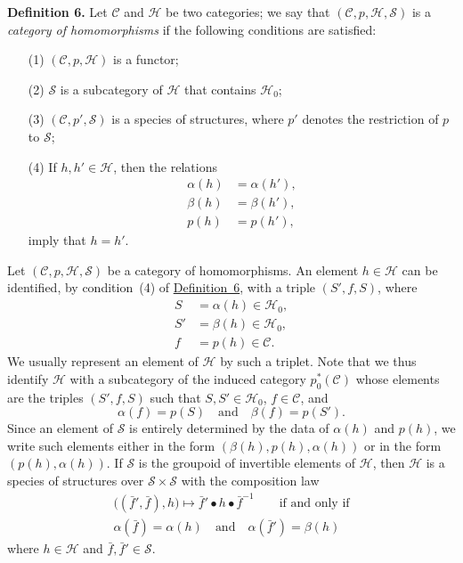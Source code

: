 \documentclass[a4paper,oneside,nobib,nofonts,notitlepage,notoc,nols,fleqn,justified]{tufte-book}
\newenvironment{rmenv}[1]
  {\phantomsection\par\medskip\noindent\textbf{#1.}\rmfamily}
  {\par\medskip}
\newcommand{\oldpage}[1]{{\reversemarginpar\marginnote{\raggedleft\footnotesize\textit{p.~#1}}}}
\newcommand{\CC}{\mathcal{C}}
\newcommand{\HH}{\mathcal{H}}
\renewcommand{\SS}{\mathcal{S}}
\begin{document}
\begin{rmenv}{Definition 6}
\label{definition:i-6}
  Let $\CC$ and $\HH$ be two categories;
  we say \cite{3a} that $(\CC,p,\HH,\SS)$ is a \emph{category of homomorphisms} if the following conditions are satisfied:
  \begin{enumerate}
    \item[\normalfont(1)]
      $(\CC,p,\HH)$ is a functor;
    \item[\normalfont(2)]
      \oldpage{357}
      $\SS$ is a subcategory of $\HH$ that contains $\HH_0$;
    \item[\normalfont(3)]
      $(\CC,p',\SS)$ is a species of structures, where $p'$ denotes the restriction of $p$ to $\SS$;
    \item[\normalfont(4)]
      If $h,h'\in\HH$, then the relations
      \[
        \begin{aligned}
          \alpha(h)
          &= \alpha(h'),
        \\\beta(h)
          &= \beta(h'),
        \\p(h)
          &= p(h'),
        \end{aligned}
      \]
      imply that $h=h'$.
  \end{enumerate}
\end{rmenv}

Let $(\CC,p,\HH,\SS)$ be a category of homomorphisms.
An element $h\in\HH$ can be identified, by condition~(4) of \hyperref[definition:i-6]{Definition~6}, with a triple $(S',f,S)$, where
\[
  \begin{aligned}
    S
    &= \alpha(h) \in\HH_0,
  \\S'
    &= \beta(h) \in\HH_0,
  \\f
    &= p(h)\in\CC.
  \end{aligned}
\]
We usually represent an element of $\HH$ by such a triplet.
Note that we thus identify $\HH$ with a subcategory of the induced category $p_0^*(\CC)$ whose elements are the triples $(S',f,S)$ such that $S,S'\in\HH_0$, $f\in\CC$, and
\[
  \alpha(f)=p(S)
  \quad\text{and}\quad
  \beta(f)=p(S').
\]
Since an element of $\SS$ is entirely determined by the data of $\alpha(h)$ and $p(h)$, we write such elements either in the form $(\beta(h),p(h),\alpha(h))$ or in the form $(p(h),\alpha(h))$.
If $\SS$ is the groupoid of invertible elements of $\HH$, then $\HH$ is a species of structures over $\SS\times\SS$ with the composition law
\[
  \begin{gathered}
    \big((\bar{f}',\bar{f}),h\big)
    \longmapsto\bar{f}'\bullet h\bullet\bar{f}^{-1}
    \qquad\text{if and only if}
  \\\alpha(\bar{f})=\alpha(h)
    \quad\text{and}\quad
    \alpha(\bar{f}')=\beta(h)
  \end{gathered}
\]
where $h\in\HH$ and $\bar{f},\bar{f}'\in\SS$.
\end{document}
